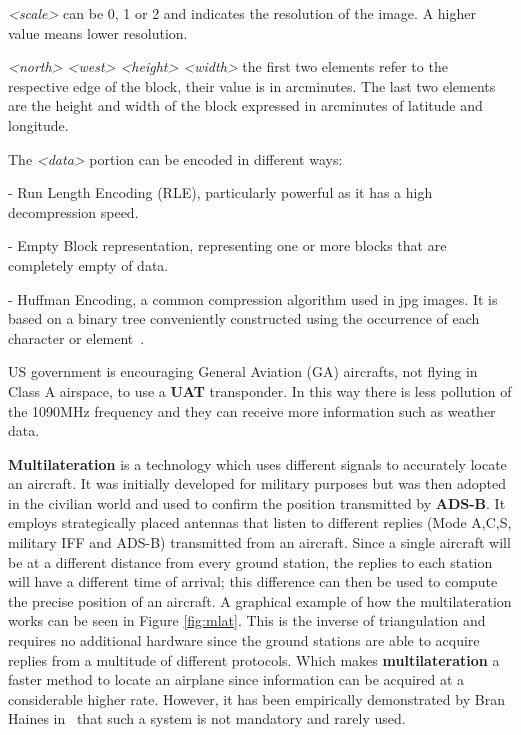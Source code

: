 \documentclass[../main.tex]{subfiles}
\begin{document}
\emph{<scale>} can be 0, 1 or 2 and indicates the resolution of the image. A higher value means lower resolution.

\emph{<north> <west> <height> <width>} the first two elements refer to the respective edge of the block, their value is in arcminutes. The last two elements are the height and width of the block expressed in arcminutes of latitude and longitude.

The \emph{<data>} portion can be encoded in different ways:

- Run Length Encoding (RLE), particularly powerful as it has a high decompression speed.

- Empty Block representation, representing one or more blocks that are completely empty of data.

- Huffman Encoding, a common compression algorithm used in jpg images. It is based on a binary tree conveniently constructed using the occurrence of each character or element~\cite{huffman}.


US government is encouraging General Aviation (GA) aircrafts, not flying in Class A airspace, to use a \textbf{UAT} transponder. In this way there is less pollution of the 1090MHz frequency and they can receive more information such as weather data.

\textbf{Multilateration} is a technology which uses different signals to accurately locate an aircraft. It was initially developed for military purposes but was then adopted in the civilian world and used to confirm the position transmitted by \textbf{ADS-B}. It employs strategically placed antennas that listen to different replies (Mode A,C,S, military IFF and ADS-B) transmitted from an aircraft. Since a single aircraft will be at a different distance from every ground station, the replies to each station will have a different time of arrival; this difference can then be used to compute the precise position of an aircraft. A graphical example of how the multilateration works can be seen in Figure \ref{fig:mlat}. This is the inverse of triangulation and requires no additional hardware since the ground stations are able to acquire replies from a multitude of different protocols. Which makes \textbf{multilateration} a faster method to locate an airplane since information can be acquired at a considerable higher rate. However, it has been empirically demonstrated by Bran Haines in~\cite{haineshackfest} that such a system is not mandatory and rarely used.
\end{document}
